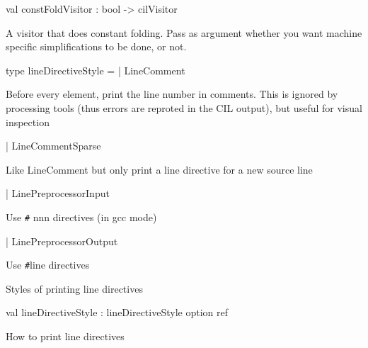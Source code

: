 \documentclass[11pt]{article}
\begin{document}
\label{val:Cil.constFoldVisitor}\begin{ocamldoccode}
val constFoldVisitor : bool -> cilVisitor
\end{ocamldoccode}
\begin{ocamldocdescription}
A visitor that does constant folding. Pass as argument whether you want 
 machine specific simplifications to be done, or not.


\end{ocamldocdescription}




\label{type:Cil.lineDirectiveStyle}\begin{ocamldoccode}
type lineDirectiveStyle =
  | LineComment
\end{ocamldoccode}
\begin{ocamldoccomment}
Before every element, print the line 
 number in comments. This is ignored by 
 processing tools (thus errors are reproted 
 in the CIL output), but useful for 
 visual inspection
\end{ocamldoccomment}
\begin{ocamldoccode}
  | LineCommentSparse
\end{ocamldoccode}
\begin{ocamldoccomment}
Like LineComment but only print a line 
 directive for a new source line
\end{ocamldoccomment}
\begin{ocamldoccode}
  | LinePreprocessorInput
\end{ocamldoccode}
\begin{ocamldoccomment}
Use \verb`#` nnn directives (in gcc mode)
\end{ocamldoccomment}
\begin{ocamldoccode}
  | LinePreprocessorOutput
\end{ocamldoccode}
\begin{ocamldoccomment}
Use \verb`#`line directives
\end{ocamldoccomment}
\begin{ocamldocdescription}
Styles of printing line directives


\end{ocamldocdescription}




\label{val:Cil.lineDirectiveStyle}\begin{ocamldoccode}
val lineDirectiveStyle : lineDirectiveStyle option ref
\end{ocamldoccode}
\begin{ocamldocdescription}
How to print line directives


\end{ocamldocdescription}
\end{document}
